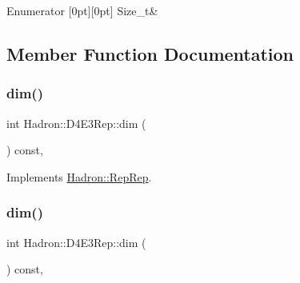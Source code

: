 \begin{DoxyEnumFields}{Enumerator}
[0pt][0pt]{}\mbox{\label{structHadron_1_1D4E3Rep_ac6cb5ba3e96372d64de82e99cbcfe52aa6c44230a5c0ef19eb4efb48ead792533}} 
Size\+\_\+t&\\
\hline

\end{DoxyEnumFields}


\subsection{Member Function Documentation}
\mbox{\label{structHadron_1_1D4E3Rep_a7e048ba087ccbf5ddfade8be991509a0}} 
\subsubsection{\texorpdfstring{dim()}{dim()}\hspace{0.1cm}{\footnotesize\ttfamily [1/3]}}
{\footnotesize\ttfamily int Hadron\+::\+D4\+E3\+Rep\+::dim (\begin{DoxyParamCaption}{ }\end{DoxyParamCaption}) const\hspace{0.3cm}{\ttfamily [inline]}, {\ttfamily [virtual]}}



Implements \mbox{\hyperlink{structHadron_1_1RepRep_a92c8802e5ed7afd7da43ccfd5b7cd92b}{Hadron\+::\+Rep\+Rep}}.

\mbox{\label{structHadron_1_1D4E3Rep_a7e048ba087ccbf5ddfade8be991509a0}} 
\subsubsection{\texorpdfstring{dim()}{dim()}\hspace{0.1cm}{\footnotesize\ttfamily [2/3]}}
{\footnotesize\ttfamily int Hadron\+::\+D4\+E3\+Rep\+::dim (\begin{DoxyParamCaption}{ }\end{DoxyParamCaption}) const\hspace{0.3cm}{\ttfamily [inline]}, {\ttfamily [virtual]}}



